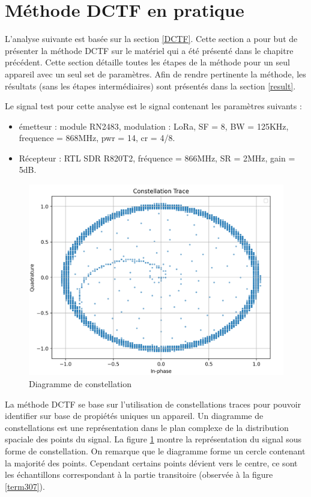  
\section{Méthode DCTF en pratique}\label{pra}

L'analyse suivante est basée sur la section \ref{DCTF}. Cette section a pour but de présenter la méthode DCTF sur le matériel qui a été présenté dans le chapitre précédent. Cette section détaille toutes les étapes de la méthode pour un seul appareil avec un seul set de paramètres. Afin de rendre pertinente la méthode, les résultats (sans les étapes intermédiaires) sont présentés dans la section \ref{result}.

Le signal test pour cette analyse est le signal contenant les paramètres suivants :

\vspace{0.1cm}

\begin{itemize}
\item émetteur : module RN2483, modulation : LoRa, SF = 8, BW = 125KHz, frequence = 868MHz, pwr = 14, cr = 4/8.
\item Récepteur : RTL SDR R820T2, fréquence = 866MHz, SR = 2MHz, gain = 5dB.
\end{itemize}

\begin{figure}[h]
\centering

\includegraphics[scale=0.25]{images/dctf1.png}
\caption{Diagramme de constellation}\label{term314}
\end{figure}


La méthode DCTF se base sur l'utilisation de constellations traces pour pouvoir identifier sur base de propiétés uniques un appareil. Un diagramme de constellations est une représentation dans le plan complexe de la distribution spaciale des points du signal. La figure \ref{term314} montre la représentation  du signal sous forme de constellation. On remarque que le diagramme forme un cercle contenant la majorité des points. Cependant certains points dévient vers le centre, ce sont les échantillons correspondant à la partie transitoire (observée à la figure \ref{term307}).

